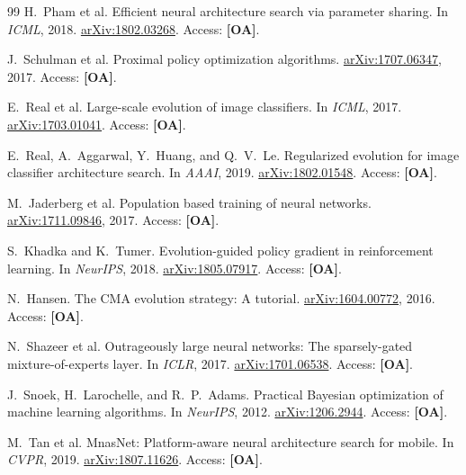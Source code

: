 \documentclass[10pt,twocolumn,letterpaper]{article}
\begin{document}
{\begin{thebibliography}{99}
H.~Pham et al.
\newblock Efficient neural architecture search via parameter sharing.
\newblock In \emph{ICML}, 2018.
\newblock \href{https://arxiv.org/abs/1802.03268}{arXiv:1802.03268}.
\newblock Access: \textbf{[OA]}.

J.~Schulman et al.
\newblock Proximal policy optimization algorithms.
\newblock \href{https://arxiv.org/abs/1707.06347}{arXiv:1707.06347}, 2017.
\newblock Access: \textbf{[OA]}.

E.~Real et al.
\newblock Large-scale evolution of image classifiers.
\newblock In \emph{ICML}, 2017.
\newblock \href{https://arxiv.org/abs/1703.01041}{arXiv:1703.01041}.
\newblock Access: \textbf{[OA]}.

E.~Real, A.~Aggarwal, Y.~Huang, and Q.~V.~Le.
\newblock Regularized evolution for image classifier architecture search.
\newblock In \emph{AAAI}, 2019.
\newblock \href{https://arxiv.org/abs/1802.01548}{arXiv:1802.01548}.
\newblock Access: \textbf{[OA]}.

M.~Jaderberg et al.
\newblock Population based training of neural networks.
\newblock \href{https://arxiv.org/abs/1711.09846}{arXiv:1711.09846}, 2017.
\newblock Access: \textbf{[OA]}.

S.~Khadka and K.~Tumer.
\newblock Evolution-guided policy gradient in reinforcement learning.
\newblock In \emph{NeurIPS}, 2018.
\newblock \href{https://arxiv.org/abs/1805.07917}{arXiv:1805.07917}.
\newblock Access: \textbf{[OA]}.

N.~Hansen.
\newblock The CMA evolution strategy: A tutorial.
\newblock \href{https://arxiv.org/abs/1604.00772}{arXiv:1604.00772}, 2016.
\newblock Access: \textbf{[OA]}.

N.~Shazeer et al.
\newblock Outrageously large neural networks: The sparsely-gated mixture-of-experts layer.
\newblock In \emph{ICLR}, 2017.
\newblock \href{https://arxiv.org/abs/1701.06538}{arXiv:1701.06538}.
\newblock Access: \textbf{[OA]}.

J.~Snoek, H.~Larochelle, and R.~P.~Adams.
\newblock Practical Bayesian optimization of machine learning algorithms.
\newblock In \emph{NeurIPS}, 2012.
\newblock \href{https://arxiv.org/abs/1206.2944}{arXiv:1206.2944}.
\newblock Access: \textbf{[OA]}.

M.~Tan et al.
\newblock MnasNet: Platform-aware neural architecture search for mobile.
\newblock In \emph{CVPR}, 2019.
\newblock \href{https://arxiv.org/abs/1807.11626}{arXiv:1807.11626}.
\newblock Access: \textbf{[OA]}.


\end{thebibliography}}
\end{document}
